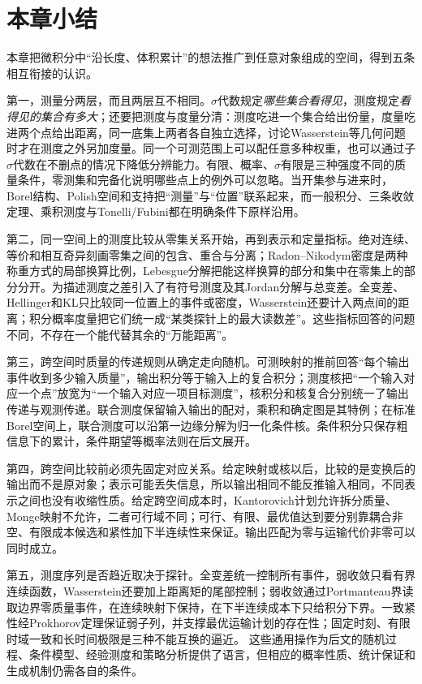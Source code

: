 \section{本章小结}

本章把微积分中“沿长度、体积累计”的想法推广到任意对象组成的空间，得到五条相互衔接的认识。

第一，测量分两层，而且两层互不相同。$\sigma$代数规定\emph{哪些集合看得见}，测度规定\emph{看得见的集合有多大}；还要把测度与度量分清：测度吃进一个集合给出份量，度量吃进两个点给出距离，同一底集上两者各自独立选择，讨论Wasserstein等几何问题时才在测度之外另加度量。同一个可测范围上可以配任意多种权重，也可以通过子$\sigma$代数在不删点的情况下降低分辨能力。有限、概率、$\sigma$有限是三种强度不同的质量条件，零测集和完备化说明哪些点上的例外可以忽略。当开集参与进来时，Borel结构、Polish空间和支持把“测量”与“位置”联系起来，而一般积分、三条收敛定理、乘积测度与Tonelli/Fubini都在明确条件下原样沿用。

第二，同一空间上的测度比较从零集关系开始，再到表示和定量指标。绝对连续、等价和相互奇异刻画零集之间的包含、重合与分离；Radon–Nikodym密度是两种称重方式的局部换算比例，Lebesgue分解把能这样换算的部分和集中在零集上的部分分开。为描述测度之差引入了有符号测度及其Jordan分解与总变差。全变差、Hellinger和KL只比较同一位置上的事件或密度，Wasserstein还要计入两点间的距离；积分概率度量把它们统一成“某类探针上的最大读数差”。这些指标回答的问题不同，不存在一个能代替其余的“万能距离”。

第三，跨空间时质量的传递规则从确定走向随机。可测映射的推前回答“每个输出事件收到多少输入质量”，输出积分等于输入上的复合积分；测度核把“一个输入对应一个点”放宽为“一个输入对应一项目标测度”，核积分和核复合分别统一了输出传递与观测传递。联合测度保留输入输出的配对，乘积和确定图是其特例；在标准Borel空间上，联合测度可以沿第一边缘分解为归一化条件核。条件积分只保存粗信息下的累计，条件期望等概率法则在后文展开。

第四，跨空间比较前必须先固定对应关系。给定映射或核以后，比较的是变换后的输出而不是原对象；表示可能丢失信息，所以输出相同不能反推输入相同，不同表示之间也没有收缩性质。给定跨空间成本时，Kantorovich计划允许拆分质量、Monge映射不允许，二者可行域不同；可行、有限、最优值达到要分别靠耦合非空、有限成本候选和紧性加下半连续性来保证。输出匹配为零与运输代价非零可以同时成立。

第五，测度序列是否趋近取决于探针。全变差统一控制所有事件，弱收敛只看有界连续函数，Wasserstein还要加上距离矩的尾部控制；弱收敛通过Portmanteau界读取边界零质量事件，在连续映射下保持，在下半连续成本下只给积分下界。一致紧性经Prokhorov定理保证弱子列，并支撑最优运输计划的存在性；固定时刻、有限时域一致和长时间极限是三种不能互换的逼近。
这些通用操作为后文的随机过程、条件模型、经验测度和策略分析提供了语言，但相应的概率性质、统计保证和生成机制仍需各自的条件。
